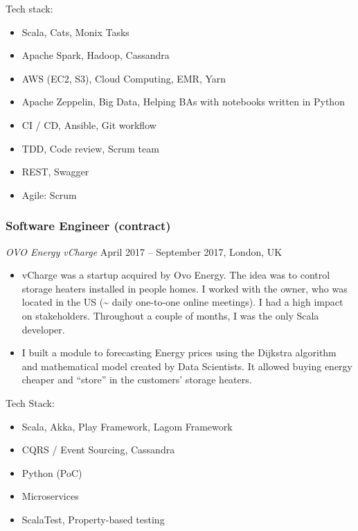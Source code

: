 \documentclass[]{rss}
\providecommand{\tightlist}{%
  \setlength{\itemsep}{0pt}\setlength{\parskip}{0pt}}
\begin{document}
\begin{resume}
Tech stack:

\begin{itemize}
\tightlist
\item
  Scala, Cats, Monix Tasks
\item
  Apache Spark, Hadoop, Cassandra
\item
  AWS (EC2, S3), Cloud Computing, EMR, Yarn
\item
  Apache Zeppelin, Big Data, Helping BAs with notebooks written in
  Python
\item
  CI / CD, Ansible, Git workflow
\item
  TDD, Code review, Scrum team
\item
  REST, Swagger
\item
  Agile: Scrum
\end{itemize}

\subsubsection{Software Engineer
(contract)}\label{software-engineer-contract}

\emph{OVO Energy \textbar{} vCharge} April 2017 -- September 2017,
London, UK

\begin{itemize}
\item
  vCharge was a startup acquired by Ovo Energy. The idea was to control
  storage heaters installed in people homes. I worked with the owner,
  who was located in the US (\textasciitilde{} daily one-to-one online
  meetings). I had a high impact on stakeholders. Throughout a couple of
  months, I was the only Scala developer.
\item
  I built a module to forecasting Energy prices using the Dijkstra
  algorithm and mathematical model created by Data Scientists. It
  allowed buying energy cheaper and ``store'' in the customers' storage
  heaters.
\end{itemize}

Tech Stack:

\begin{itemize}
\tightlist
\item
  Scala, Akka, Play Framework, Lagom Framework
\item
  CQRS / Event Sourcing, Cassandra
\item
  Python (PoC)
\item
  Microservices
\item
  ScalaTest, Property-based testing
\end{itemize}


\end{resume}
\end{document}
